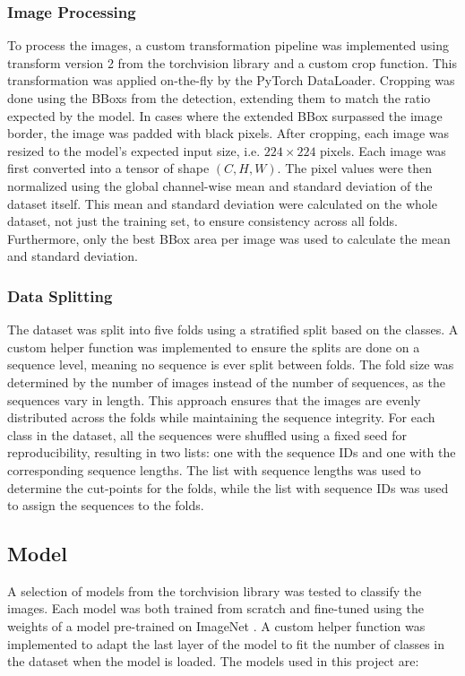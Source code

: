         \subsubsection{Image Processing}
        To process the images, a custom transformation pipeline was implemented using transform version 2 from the torchvision library and a custom crop function.
        This transformation was applied on-the-fly by the PyTorch DataLoader.
        Cropping was done using the \acp{BBox} from the detection, extending them to match the ratio expected by the model.
        In cases where the extended \ac{BBox} surpassed the image border, the image was padded with black pixels.
        After cropping, each image was resized to the model's expected input size, i.e. \(224\times224\) pixels.
        Each image was first converted into a tensor of shape \((C,H,W)\).
        The pixel values were then normalized using the global channel-wise mean and standard deviation of the dataset itself.
        This mean and standard deviation were calculated on the whole dataset, not just the training set, to ensure consistency across all folds.
        Furthermore, only the best \ac{BBox} area per image was used to calculate the mean and standard deviation.


    \subsubsection{Data Splitting}
    The dataset was split into five folds using a stratified split based on the classes.
    A custom helper function was implemented to ensure the splits are done on a sequence level, meaning no sequence is ever split between folds.
    The fold size was determined by the number of images instead of the number of sequences, as the sequences vary in length.
    This approach ensures that the images are evenly distributed across the folds while maintaining the sequence integrity.
    For each class in the dataset, all the sequences were shuffled using a fixed seed for reproducibility, resulting in two lists: one with the sequence IDs and one with the corresponding sequence lengths.
    The list with sequence lengths was used to determine the cut-points for the folds, while the list with sequence IDs was used to assign the sequences to the folds.


    \subsection{Model}
    A selection of models from the torchvision library was tested to classify the images.
    Each model was both trained from scratch and fine-tuned using the weights of a model pre-trained on ImageNet \autocite{dengImageNetLargescaleHierarchical2009}.
    A custom helper function was implemented to adapt the last layer of the model to fit the number of classes in the dataset when the model is loaded.
    The models used in this project are:


